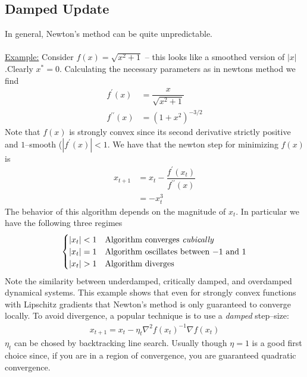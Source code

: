 \subsection{Damped Update}
In general, Newton's method can be quite unpredictable. \\ \\
\underline{Example:}  Consider $f(x) = \sqrt{x^2 +1}$ -- this looks like a smoothed version of $|x|$.Clearly $x^* = 0$. Calculating the necessary parameters as in newtons method we find
\begin{align*}
    f^\prime (x) &= \dfrac{x}{\sqrt{x^2 + 1}} \\
    f^{\prime \prime} (x) &= (1+x^2)^{-3/2}
\end{align*}
Note that $f(x)$ is strongly convex since its second derivative strictly positive and $1$--smooth ($| f^\prime (x) | < 1$. We have that the newton step for minimizing $f(x)$ is
\begin{align*}
    x_{t+1} &= x_t - \dfrac{f^\prime (x_t)}{f^{\prime \prime}(x)} \\
    &= -x_t^3
\end{align*}
The behavior of this algorithm depends on the magnitude of $x_t$. In particular we have the following three regimes
\[ \begin{cases} 
      |x_t| < 1 & \text{Algorithm converges \textit{cubically}}\\
      |x_t| = 1 & \text{Algorithm oscillates between $-1$ and $1$} \\
      |x_t| > 1 & \text{Algorithm diverges} 
   \end{cases}
\]
Note the similarity between underdamped, critically damped, and overdamped dynamical systems. This example shows that even for strongly convex functions with Lipschitz gradients that Newton's method is only guaranteed to converge locally. To avoid divergence, a popular technique is to use a \textit{damped} step--size:
\begin{align*}
    x_{t+1} = x_t - \eta_t \nabla^2 f(x_t)^{-1} \nabla f(x_t)
\end{align*}
$\eta_t$ can be chosed by backtracking line search. Usually though $\eta = 1$ is a good first choice since, if you are in a region of convergence, you are guaranteed quadratic convergence.

